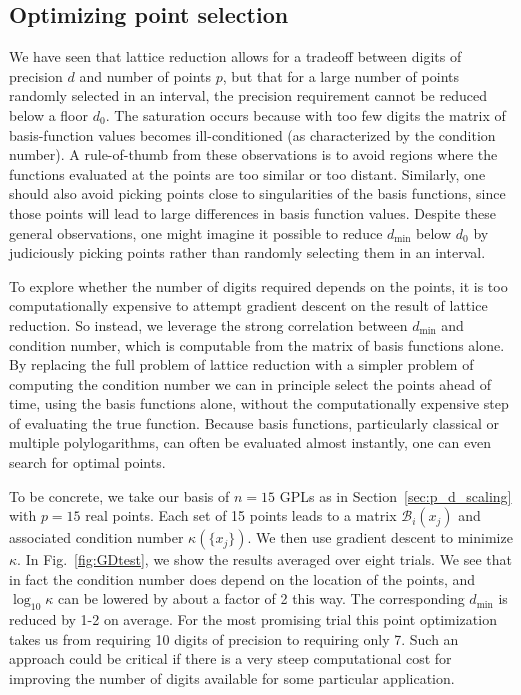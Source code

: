 \documentclass[a4paper,11pt]{article}
\newcommand{\cB}{ {\mathcal B} }
\newcommand{\dmin}{d_{\text{min}}}
\begin{document}
\subsection{Optimizing point selection}
We have seen that lattice reduction allows for a tradeoff between digits of precision $d$ and number of points $p$, but that for a large number of points randomly selected in an interval, the precision requirement cannot be reduced below a floor $d_0$.
The saturation occurs because with too few digits the matrix of basis-function values becomes ill-conditioned (as characterized by the condition number). 
A rule-of-thumb from these observations is to avoid regions where the functions evaluated at the points are too similar or too distant. Similarly, one should also avoid picking points close to singularities of the basis functions, since those points will lead to large differences in basis function values. 
Despite these general observations, one might imagine it possible to reduce $\dmin$ below $d_0$ by judiciously picking points rather than randomly selecting them in an interval. 

To explore whether the number of digits required depends on the points, it is too computationally expensive to attempt gradient descent on the result of lattice reduction. So instead, we leverage the  strong correlation between $\dmin$ and condition number, which is computable from the matrix of basis functions alone. By replacing the full problem of lattice reduction with a simpler problem of computing the condition number we can in principle select the points ahead of time, using the basis functions alone, without the computationally expensive step of evaluating the true function. Because basis functions, particularly classical or multiple polylogarithms, can often be evaluated almost instantly, one can even search for optimal points.

To be concrete, we take our basis of $n=15$ GPLs as in Section~\ref{sec:p_d_scaling} with $p=15$ real points. Each set of 15 points leads to a matrix $\cB_i(x_j)$ and associated condition number $\kappa(\{x_j\})$. We then use gradient descent 
to minimize $\kappa$. In Fig.~\ref{fig:GDtest}, we show the results averaged over eight trials. We see that in fact the condition number does depend on the location of the points, and $\log_{10} \kappa$ can be lowered by about a factor of 2 this way. The corresponding $\dmin$ is reduced by 1-2 on average. For the most promising trial this point optimization takes us from requiring 10 digits of precision to requiring only 7. Such an approach could be critical if there is a very steep computational cost for improving the number of digits available for some particular application. 
\end{document}
